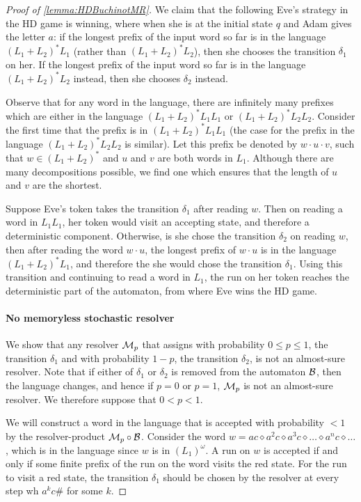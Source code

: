\begin{proof}[Proof of \cref{lemma:HDBuchinotMR}]
 We claim that the following Eve's strategy in the HD game is winning, where when she is at the initial state $q$ and Adam gives the letter $a$: if the longest prefix of the input word so far is in the language $(L_1 + L_2)^*L_1$ (rather than $(L_1 + L_2)^*L_2$), then she chooses the transition $\delta_1$ on her. If the longest prefix of the input word so far is in the language $(L_1 + L_2)^*L_2$ instead, then she chooses $\delta_2$ instead. 

Observe that for any word in the language, there are infinitely many prefixes which are either in the language $(L_1 + L_2)^*L_1L_1$ or $(L_1 + L_2)^*L_2L_2$. Consider the first time that the prefix is in $(L_1 + L_2)^*L_1L_1$ (the case for the prefix in the language $(L_1 + L_2)^*L_2L_2$ is similar). Let this prefix be denoted by $w \cdot u\cdot v$, such that $w\in (L_1 + L_2)^*$ and $u$ and $v$ are both words in $L_1$. Although there are many decompositions possible, we find one which ensures that the length of $u$ and $v$ are the shortest. 

Suppose Eve's token takes the transition $\delta_1$ after reading $w$. Then on reading a word in $L_1L_1$, her token would visit an accepting state, and therefore a deterministic component. Otherwise, is she chose the transition $\delta_2$ on reading $w$, then after reading the word $w\cdot u$, the longest prefix of $w\cdot u $ is in the language $(L_1 + L_2)^*L_1$, and therefore the she would chose the transition $\delta_1$. Using this transition and continuing to read a word in $L_1$, the run on her token reaches the deterministic part of the automaton, from where Eve wins the HD game. 

\paragraph*{No memoryless stochastic resolver}
We show that any resolver $\mathcal{M}_p$ that assigns with probability $0\leq p \leq 1$, the transition $\delta_1$ and with probability $1-p$, the transition $\delta_2$,
is not an almost-sure resolver. Note that if either of $\delta_1$ or $\delta_2$ is removed from the automaton $\mathcal{B}$, then the language changes, and hence if $p=0$ or $p=1$, $\mathcal{M}_p$ is not an almost-sure resolver. We therefore suppose that $0<p<1$.

We will construct a word in the language that is accepted with probability $<1$ by the resolver-product $\mathcal{M}_p \circ \mathcal{B}$. Consider the word $w = ac\diamond a^2c\diamond a^3c\diamond\dots \diamond a^{n}c\diamond\dots$, which is in the language since $w$ is in $(L_1)^\omega$. 
A run on $w$ is accepted if and only if some finite prefix of the run on the word visits the red state. For the run to visit a red state, the transition $\delta_1$ should be chosen by the resolver at every step wh $a^kc\#$ for some $k$. 


\end{proof}
